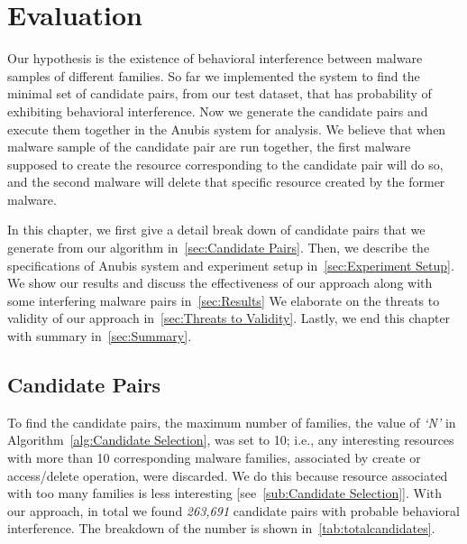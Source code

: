 \chapter{Evaluation}
\label{chapter:evaluation}
Our hypothesis is the existence of behavioral interference between malware samples of different families.
So far we implemented the system to find the minimal set of candidate pairs, from our test dataset, that has probability of exhibiting behavioral interference.
Now we generate the candidate pairs and execute them together in the Anubis system for analysis.
We believe that when malware sample of the candidate pair are run together, the first malware supposed to create the resource corresponding to the candidate pair will do so, and the second malware will delete that specific resource created by the former malware.

In this chapter, we first give a detail break down of candidate pairs that we generate from our algorithm in~\autoref{sec:Candidate Pairs}.
Then, we describe the specifications of Anubis system and experiment setup in~\autoref{sec:Experiment Setup}.
We show our results and discuss the effectiveness of our approach along with some interfering malware pairs in~\autoref{sec:Results}
We elaborate on the threats to validity of our approach in~\autoref{sec:Threats to Validity}.
Lastly, we end this chapter with summary in~\autoref{sec:Summary}.

\section{Candidate Pairs}
\label{sec:Candidate Pairs}
To find the candidate pairs, the maximum number of families, the value of \emph{`N'} in Algorithm~\autoref{alg:Candidate Selection}, was set to 10;
i.e., any interesting resources with more than 10 corresponding malware families, associated by create or access/delete operation, were discarded.
We do this because resource associated with too many families is less interesting [see~\autoref{sub:Candidate Selection}].
With our approach, in total we found \emph{263,691} candidate pairs with probable behavioral interference.
The breakdown of the number is shown in~\autoref{tab:totalcandidates}.


